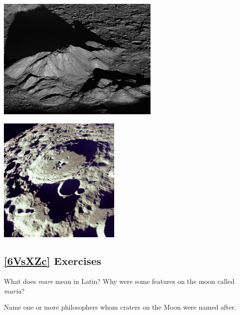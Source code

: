 \documentclass{article}
\numberwithin{equation}{section}
\numberwithin{figure}{section}
\begin{document}
\vspace{1em}

\begin{center}
\begin{minipage}{0.45\textwidth}
    \centering
    \includegraphics[width=8cm]{Figures/Unit10_Figure9.6.jpeg}
\end{minipage}%
\hspace{5mm}
\begin{minipage}{0.45\textwidth}
    \centering
    \includegraphics[width=6cm]{Figures/Unit10_Figure9.7.jpeg}
\end{minipage}
\end{center}




\subsection*{\ref{6VsXZc} Exercises}

\begin{exercise}
    What does \textit{mare} mean in Latin? Why were some features on the moon called \textit{maria}?
\end{exercise}

\begin{exercise}
    Name one or more philosophers whom craters on the Moon were named after.
\end{exercise}
\end{document}
